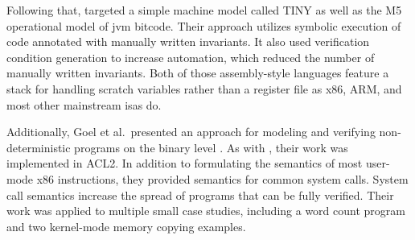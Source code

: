 Following that, \textcite{matthews2006verification}
targeted a simple machine model called TINY
as well as the M5 operational model of \ac{jvm} bitcode.
Their approach utilizes symbolic execution of code annotated
with manually written invariants.
It also used verification condition generation to increase automation,
which reduced the number of manually written invariants.
Both of those assembly-style languages feature a stack
for handling scratch variables rather than a register file
as x86, ARM, and most other mainstream \acp{isa} do.

Additionally, Goel et al.\ presented an approach for modeling and verifying
non-deterministic programs on the binary level \autocite{goel2014syscalls,goelphd}.
As with \textcite{matthews2006verification}, their work was implemented in ACL2.
In addition to formulating the semantics of most user-mode x86 instructions,
they provided semantics for common system calls.
System call semantics increase the spread of programs that can be fully verified.
Their work was applied to multiple small case studies,
including a word count program and two kernel-mode memory copying examples.

